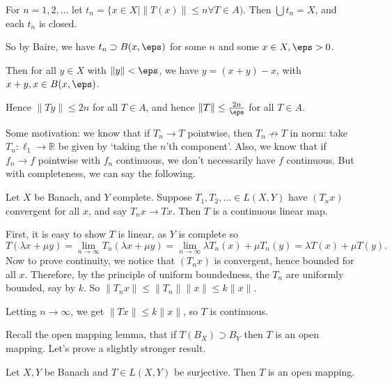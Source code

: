 \documentclass[12pt]{article}
\begin{document}
\begin{proofbox}
	For $n = 1, 2, \ldots$ let $t_n = \{x \in X \mid \|T(x)\| \leq n \forall T \in A)$. Then $\bigcup t_n = X$, and each $t_n$ is closed.

		So by Baire, we have $t_n \supset B(x, \eps)$ for some $n$ and some $x \in X, \eps > 0$.

		Then for all $y \in X$ with $\|y\| < \eps$, we have $y = (x+y) - x$, with $x+y, x \in B(x, \eps)$.

		Hence $\|Ty\| \leq 2n$ for all $T \in A$, and hence $\|T\| \leq \frac{2n}{\eps}$ for all $T \in A$.
\end{proofbox}

Some motivation: we know that if $T_n \to T$ pointwise, then $T_n \not \to T$ in norm: take $T_n : \ell_1 \to \mathbb{R}$ be given by `taking the $n$'th component'. Also, we know that if $f_n \to f$ pointwise with $f_n$ continuous, we don't necessarily have $f$ continuous. But with completeness, we can say the following.

\begin{corollary}
	Let $X$ be Banach, and $Y$ complete. Suppose $T_1, T_2, \ldots \in L(X,Y)$ have $(T_nx)$ convergent for all $x$, and say $T_nx \to Tx$. Then $T$ is a continuous linear map.
\end{corollary}

\begin{proofbox}
	First, it is easy to show $T$ is linear, as $Y$ is complete so
	\[
	T(\lambda x + \mu y) = \lim_{n \to \infty}T_n(\lambda x + \mu y) = \lim_{n \to \infty} \lambda T_n(x) + \mu T_n(y) = \lambda T(x) + \mu T(y).
	\]
	Now to prove continuity, we notice that $(T_nx)$ is convergent, hence bounded for all $x$. Therefore, by the principle of uniform boundedness, the $T_n$ are uniformly bounded, say by $k$. So $\|T_n x\| \leq \|T_n\|\|x\| \leq k \|x\|$.

	Letting $n \to \infty$, we get $\|Tx\| \leq k\|x\|$, so $T$ is continuous.
\end{proofbox}

Recall the open mapping lemma, that if $T(B_X) \supset B_Y$ then $T$ is an open mapping. Let's prove a slightly stronger result.

\begin{theorem}
	Let $X, Y$ be Banach and $T \in L(X, Y)$ be surjective. Then $T$ is an open mapping.
\end{theorem}
\end{document}
